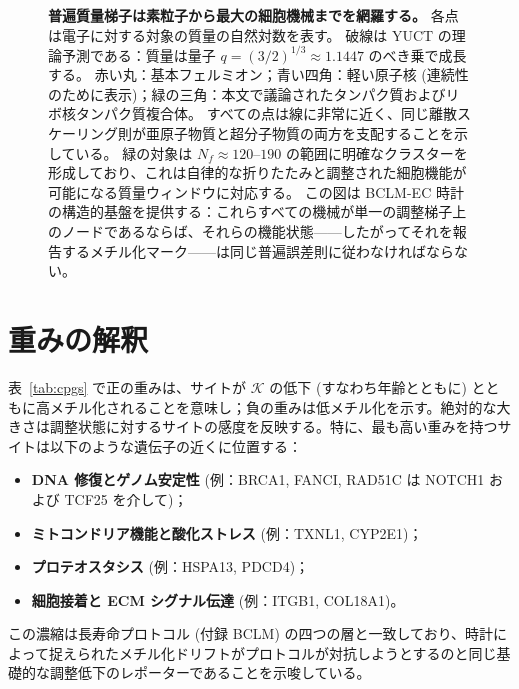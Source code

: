 \documentclass[12pt,a4paper]{ltjsarticle}
\newcommand{\REL}{\mathcal{K}}          %
\begin{document}
\begin{figure}[H]
		\caption{\textbf{普遍質量梯子は素粒子から最大の細胞機械までを網羅する。} 
			各点は電子に対する対象の質量の自然対数を表す。
			破線は YUCT の理論予測である：質量は量子 \(q = (3/2)^{1/3} \approx 1.1447\) のべき乗で成長する。
			赤い丸：基本フェルミオン；青い四角：軽い原子核 (連続性のために表示)；緑の三角：本文で議論されたタンパク質およびリボ核タンパク質複合体。
			すべての点は線に非常に近く、同じ離散スケーリング則が亜原子物質と超分子物質の両方を支配することを示している。
			緑の対象は \(N_f \approx 120\)--\(190\) の範囲に明確なクラスターを形成しており、これは自律的な折りたたみと調整された細胞機能が可能になる質量ウィンドウに対応する。
			この図は BCLM-EC 時計の構造的基盤を提供する：これらすべての機械が単一の調整梯子上のノードであるならば、それらの機能状態——したがってそれを報告するメチル化マーク——は同じ普遍誤差則に従わなければならない。}
		\label{fig:mass_ladder_bclm}
	\end{figure}
	
	\section{重みの解釈}
	\label{sec:weights}
	表~\ref{tab:cpgs} で正の重みは、サイトが \(\REL\) の低下 (すなわち年齢とともに) とともに高メチル化されることを意味し；負の重みは低メチル化を示す。絶対的な大きさは調整状態に対するサイトの感度を反映する。特に、最も高い重みを持つサイトは以下のような遺伝子の近くに位置する：
	\begin{itemize}
		\item \textbf{DNA 修復とゲノム安定性} (例：BRCA1, FANCI, RAD51C は NOTCH1 および TCF25 を介して)；
		\item \textbf{ミトコンドリア機能と酸化ストレス} (例：TXNL1, CYP2E1)；
		\item \textbf{プロテオスタシス} (例：HSPA13, PDCD4)；
		\item \textbf{細胞接着と ECM シグナル伝達} (例：ITGB1, COL18A1)。
	\end{itemize}
	この濃縮は長寿命プロトコル (付録 BCLM) の四つの層と一致しており、時計によって捉えられたメチル化ドリフトがプロトコルが対抗しようとするのと同じ基礎的な調整低下のレポーターであることを示唆している。
	
\end{document}
